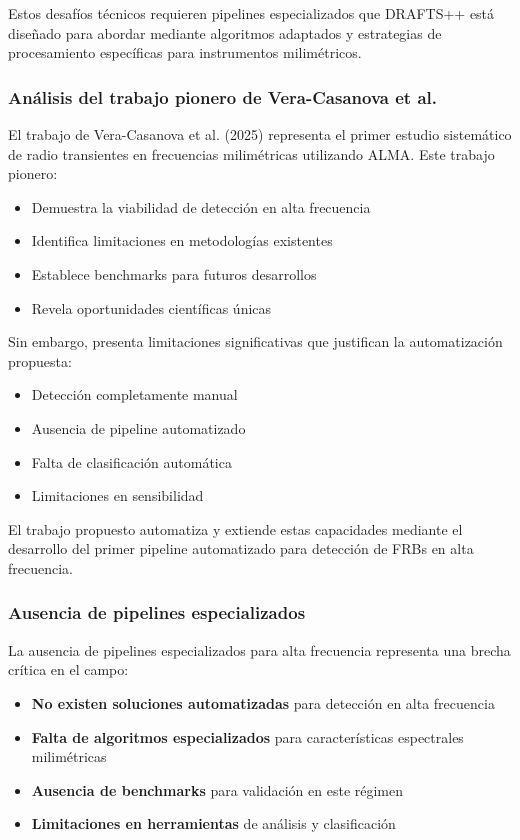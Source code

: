 Estos desafíos técnicos requieren pipelines especializados que DRAFTS++ está diseñado para abordar mediante algoritmos adaptados y estrategias de procesamiento específicas para instrumentos milimétricos.

\subsubsection{Análisis del trabajo pionero de Vera-Casanova et al.}

El trabajo de Vera-Casanova et al. (2025) \cite{veracasanova2025} representa el primer estudio sistemático de radio transientes en frecuencias milimétricas utilizando ALMA. Este trabajo pionero:

\begin{itemize}
    \item Demuestra la viabilidad de detección en alta frecuencia
    \item Identifica limitaciones en metodologías existentes
    \item Establece benchmarks para futuros desarrollos
    \item Revela oportunidades científicas únicas
\end{itemize}

Sin embargo, presenta limitaciones significativas que justifican la automatización propuesta:
\begin{itemize}
    \item Detección completamente manual
    \item Ausencia de pipeline automatizado
    \item Falta de clasificación automática
    \item Limitaciones en sensibilidad
\end{itemize}

El trabajo propuesto automatiza y extiende estas capacidades mediante el desarrollo del primer pipeline automatizado para detección de FRBs en alta frecuencia.

\subsubsection{Ausencia de pipelines especializados}

La ausencia de pipelines especializados para alta frecuencia representa una brecha crítica en el campo:

\begin{itemize}
    \item \textbf{No existen soluciones automatizadas} para detección en alta frecuencia
    \item \textbf{Falta de algoritmos especializados} para características espectrales milimétricas
    \item \textbf{Ausencia de benchmarks} para validación en este régimen
    \item \textbf{Limitaciones en herramientas} de análisis y clasificación
\end{itemize}

